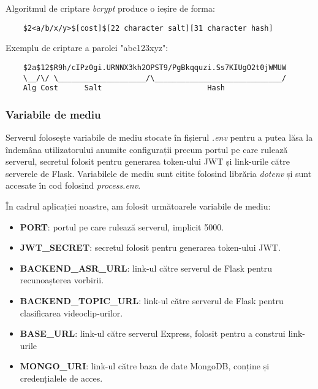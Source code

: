 \par
Algoritmul de criptare \textit{bcrypt} produce o ieșire de forma:
\begin{verbatim}
    $2<a/b/x/y>$[cost]$[22 character salt][31 character hash]
\end{verbatim}

Exemplu de criptare a parolei "abc123xyz"\footnotemark[1]:
\begin{verbatim}
    $2a$12$R9h/cIPz0gi.URNNX3kh2OPST9/PgBkqquzi.Ss7KIUgO2t0jWMUW
    \__/\/ \____________________/\_____________________________/
    Alg Cost      Salt                        Hash
\end{verbatim}


\subsubsection{Variabile de mediu}
Serverul folosește variabile de mediu stocate în fișierul \textit{.env} pentru a putea lăsa
la îndemâna utilizatorului anumite configurații precum portul pe care rulează serverul, secretul
folosit pentru generarea token-ului JWT și link-urile către serverele de Flask. Variabilele de mediu
sunt citite folosind librăria \textit{dotenv} și sunt accesate în cod folosind \textit{process.env}.
\par
În cadrul aplicației noastre, am folosit următoarele variabile de mediu:
\begin{itemize}
    \item \textbf{PORT}: portul pe care rulează serverul, implicit 5000.
    \item \textbf{JWT\_SECRET}: secretul folosit pentru generarea token-ului JWT.
    \item \textbf{BACKEND\_ASR\_URL}: link-ul către serverul de Flask pentru recunoașterea vorbirii.
    \item \textbf{BACKEND\_TOPIC\_URL}: link-ul către serverul de Flask pentru clasificarea videoclip-urilor.
    \item \textbf{BASE\_URL}: link-ul către serverul Express, folosit pentru a construi link-urile
    \item \textbf{MONGO\_URI}: link-ul către baza de date MongoDB, conține și credențialele de acces.
\end{itemize}


